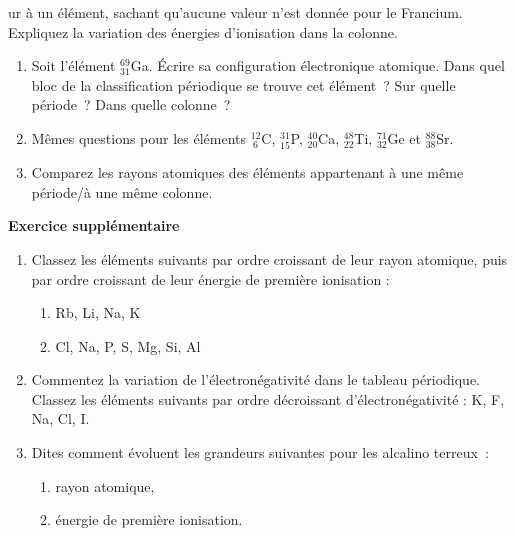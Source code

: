 ur \`a un \'el\'ement, sachant qu'aucune valeur n'est donn\'ee pour le Francium. Expliquez la variation des \'energies d'ionisation dans la colonne.
\begin{enumerate}[\bf 1)]
\item Soit l'\'el\'ement $_{31}^{69}$Ga. \'Ecrire sa configuration \'electronique atomique.
Dans quel bloc de la classification p\'eriodique se trouve cet \'el\'ement~?
Sur quelle p\'eriode~?
Dans quelle colonne~?
\item M\^emes questions pour les \'el\'ements $_{~6}^{12}$C, $_{15}^{31}$P, $_{20}^{40}$Ca, 
$_{22}^{48}$Ti, $_{32}^{71}$Ge et $_{38}^{88}$Sr.
\item Comparez les rayons atomiques des \'el\'ements appartenant \`a une m\^eme p\'eriode/\`a une m\^eme colonne.
\end{enumerate}
{\bf Exercice supplémentaire}
\begin{enumerate}[\bf 1)]
\item Classez les \'el\'ements suivants par ordre croissant de leur rayon atomique, puis par ordre croissant
de leur énergie de première ionisation :
\begin{enumerate}%
\item Rb, Li, Na, K
\item Cl, Na, P, S, Mg, Si, Al
\end{enumerate}
\item Commentez la variation de l'\'electron\'egativit\'e dans le tableau p\'eriodique. Classez les \'el\'ements suivants par ordre d\'ecroissant d'\'electron\'egativit\'e : K, F, Na, Cl, I.
\item Dites comment \'evoluent les grandeurs suivantes pour les alcalino terreux~:
\begin{enumerate}%
\item rayon atomique,
\item \'energie de premi\`ere ionisation.
\end{enumerate}
\end{enumerate}
%
